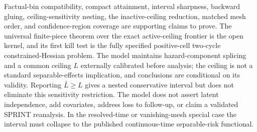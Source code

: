 \documentclass{article}
\begin{document}
Factual-bin compatibility, compact attainment, interval sharpness, backward gluing, ceiling-sensitivity nesting, the inactive-ceiling reduction, matched mesh order, and confidence-region coverage are supporting claims to prove. The universal finite-piece theorem over the exact active-ceiling frontier is the open kernel, and its first kill test is the fully specified positive-cell two-cycle constrained-Hessian problem. The model maintains hazard-component splicing and a common ceiling \(L\) externally calibrated before analysis; the ceiling is not a standard separable-effects implication, and conclusions are conditional on its validity. Reporting \(\bar L\ge L\) gives a nested conservative interval but does not eliminate this sensitivity restriction. The model does not assert latent independence, add covariates, address loss to follow-up, or claim a validated SPRINT reanalysis. In the resolved-time or vanishing-mesh special case the interval must collapse to the published continuous-time separable-risk functional.
\end{document}
